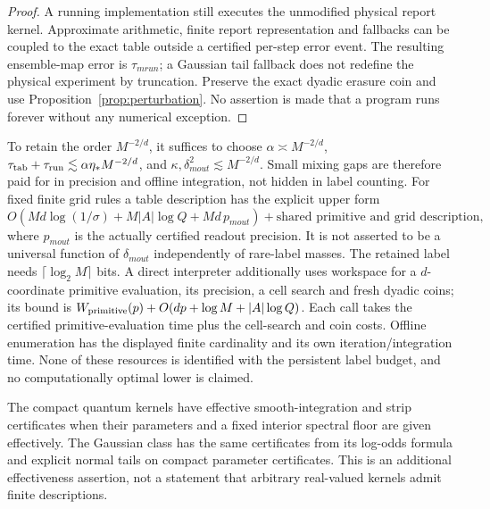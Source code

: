 \begin{proof}
A running implementation still executes the unmodified physical report kernel. Approximate arithmetic, finite report representation and fallbacks can be coupled to the exact table outside a certified per-step error event. The resulting ensemble-map error is $\tau_{
m run}$; a Gaussian tail fallback does not redefine the physical experiment by truncation. Preserve the exact dyadic erasure coin and use Proposition~\ref{prop:perturbation}. No assertion is made that a program runs forever without any numerical exception.
\end{proof}

To retain the order $M^{-2/d}$, it suffices to choose $\alpha\asymp M^{-2/d}$, $\tau_{\rm tab}+\tau_{\rm run}\lesssim\alpha\eta_*M^{-2/d}$, and $\kappa,\delta_{
m out}^2\lesssim M^{-2/d}$. Small mixing gaps are therefore paid for in precision and offline integration, not hidden in label counting. For fixed finite grid rules a table description has the explicit upper form
\[
 O\!\left(Md\log(1/\sigma)+M|A|\log Q+Md\,p_{
m out}\right)
       +\text{shared primitive and grid description},
\]
where $p_{
m out}$ is the actually certified readout precision. It is not asserted to be a universal function of $\delta_{
m out}$ independently of rare-label masses. The retained label needs $\lceil\log_2M\rceil$ bits. A direct interpreter additionally uses workspace for a $d$-coordinate primitive evaluation, its precision, a cell search and fresh dyadic coins; its bound is $W_{\rm primitive}(p)+O(dp+\log M+|A|\log Q)$. Each call takes the certified primitive-evaluation time plus the cell-search and coin costs. Offline enumeration has the displayed finite cardinality and its own iteration/integration time. None of these resources is identified with the persistent label budget, and no computationally optimal lower is claimed.

The compact quantum kernels have effective smooth-integration and strip certificates when their parameters and a fixed interior spectral floor are given effectively. The Gaussian class has the same certificates from its log-odds formula and explicit normal tails on compact parameter certificates. This is an additional effectiveness assertion, not a statement that arbitrary real-valued kernels admit finite descriptions.
